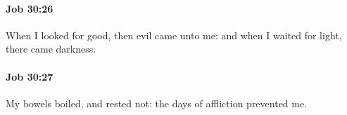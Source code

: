		\paragraph{Job 30:26} %
			\label{JOB-30-26}

			When I looked for good, then evil came unto me: and when I waited for light, there came darkness.


		\paragraph{Job 30:27} %
			\label{JOB-30-27}

			My bowels boiled, and rested not: the days of affliction prevented me.


